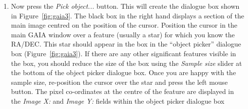 \documentclass[twoside,11pt]{article}
\newcommand{\latex}[1]{#1}
\newcommand{\html}[1]{}
\renewcommand{\_}{\texttt{\symbol{95}}}
\begin{document}
\begin{enumerate}
\item Now press the \emph{Pick object...} button. This will create the
dialogue box shown in \latex{Figure~\ref{fig:gaia3}.} \html{the next figure.}
The black box in the 
right hand displays a section of the main image centred on the position 
of the cursor. Position the cursor in the main GAIA window over a feature
(usually a star) for which you know the RA/DEC. This star should appear
in the box in the ``object picker'' dialogue box (Figure~\ref{fig:gaia3}).
If there are any other significant features visible in the box, you should 
reduce the size of the box using the \emph{Sample size} slider at the
bottom of the object picker dialogue box. Once you are happy with the
sample size, re-position the cursor over the star and press the left
mouse button. The pixel co-ordinates at the centre of the feature are
displayed in the \emph{Image X:} and \emph{Image Y:} fields within the
object picker dialogue box


\end{enumerate}
\end{document}
